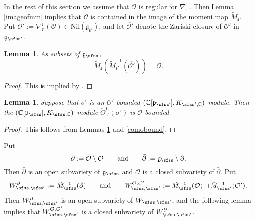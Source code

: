 \documentclass[12pt,a4paper]{amsart}
\newcommand{\CO}{{\mathcal {O}}}
\newcommand{\g}{\mathfrak g}
\newcommand{\p}{\mathfrak p}
\def\DD{\nabla}
\numberwithin{equation}{section}
\newtheorem{lem}[thm]{Lemma}
\theoremstyle{remark}
\begin{document}
In the rest of this section we assume that $\CO$ is regular for $\DD_{\mathsf s'}^{\mathsf s}$. Then Lemma \ref{imageofmm} implies that  $\CO$ is contained in the image of the moment map $\tilde M_{\mathsf s}$. Put  $\CO':=\DD_{\mathsf s'}^{\mathsf s}(\CO)\in  \mathrm{Nil}(\g_{\mathsf s'})$, and let  $\overline{\CO'}$ denote the Zariski closure of $\CO'$ in $\g_{\sfss'}$.


\begin{lem}\label{liftop000}
As subsets of $\g_\sfss$,
\[
  \tilde M_{\mathsf s}(\tilde M_{\mathsf s'}^{-1}(\overline{\CO'}))=\overline{\CO}.
\]
\end{lem}
\begin{proof}
This is implied by \cite[Theorems 5.2 and 5.6]{DKPC}.
\end{proof}


\begin{lem}\label{comobound2}
Suppose that $\sigma'$ is an $\CO'$-bounded $(\C[\p_{\sfss'}], K_{\sfss', \C})$-module.  Then the  $(\C[\p_{\sfss}], K_{\sfss, \C})$-module   $\check \Theta_{\mathsf s'}^{\mathsf s}(\sigma')$ is $\CO$-bounded.
\end{lem}
\begin{proof}
This follows from Lemmas \ref{liftop000} and \ref{comobound}.
\end{proof}


Put
\[
\partial :=\overline \CO\setminus \CO\qquad\textrm{and}\qquad  \bar \partial :=\g_\sfss\setminus \partial.
\]
Then $\bar \partial$ is an open subvariety of $\g_\sfss$ and $\CO$ is a closed subvariety of $\bar \partial$.
Put
\[
W_{\sfss, \sfss'}^{\bar \partial}:=\tilde M_{\sfss}^{-1}(\bar \partial )
\qquad\textrm{and}\qquad
  W_{\sfss, \sfss'}^{\CO, \CO'}:=\tilde M_{\sfss}^{-1}(\CO)\cap  \tilde M_{\sfss'}^{-1}(\CO').
\]
Then $W_{\sfss, \sfss'}^{\bar \partial}$ is an open subvariety of $W_{\sfss, \sfss'}$, and the following lemma implies that $W_{\sfss, \sfss'}^{\CO, \CO'}$ is a closed subvariety of $W_{\sfss, \sfss'}^{\bar \partial}$.
\end{document}
